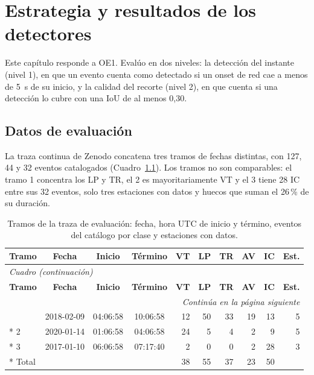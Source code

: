\documentclass[12pt,oneside,spanish,oldfontcommands]{memoir}
\begin{document}
\chapter[Estrategia y resultados de los detectores][Resultados de los detectores]{Estrategia y resultados de los detectores}
\label{cap:detectores}

Este capítulo responde a OE1. Evalúo en dos niveles: la detección del
instante (nivel 1), en que un evento cuenta como detectado si un onset de red
cae a menos de 5~s de su inicio, y la calidad del recorte (nivel 2), en que
cuenta si una detección lo cubre con una IoU de al menos 0,30.

\section{Datos de evaluación}
\label{sec:datos-evaluacion}

La traza continua de Zenodo \parencite{espinosacurilem2025dataset}
concatena tres tramos de fechas distintas, con 127, 44 y 32 eventos
catalogados (Cuadro~\ref{tab:tramos}). Los tramos no son comparables: el
tramo 1 concentra los LP y TR, el 2 es mayoritariamente VT y el 3 tiene 28 IC
entre sus 32 eventos, solo tres estaciones con datos y huecos que suman el
26\,\% de su duración.

{\small
\setlength{\tabcolsep}{4pt}
\begin{longtable}{lcccrrrrrr}
\caption{Tramos de la traza de evaluación: fecha, hora UTC de inicio y término, eventos del catálogo por clase y estaciones con datos.}\label{tab:tramos}\\
\toprule
\textbf{Tramo} & \textbf{Fecha} & \textbf{Inicio} & \textbf{Término} & \textbf{VT} & \textbf{LP} & \textbf{TR} & \textbf{AV} & \textbf{IC} & \textbf{Est.} \\
\midrule
\endfirsthead
\multicolumn{10}{l}{\itshape Cuadro \thetable{} (continuación)}\\
\toprule
\textbf{Tramo} & \textbf{Fecha} & \textbf{Inicio} & \textbf{Término} & \textbf{VT} & \textbf{LP} & \textbf{TR} & \textbf{AV} & \textbf{IC} & \textbf{Est.} \\
\midrule
\endhead
\midrule
\multicolumn{10}{r}{\itshape Continúa en la página siguiente}\\
\endfoot
\bottomrule
\endlastfoot
1 & 2018-02-09 & 04:06:58 & 10:06:58 & 12 & 50 & 33 & 19 & 13 & 5 \\*
2 & 2020-01-14 & 01:06:58 & 04:06:58 & 24 & 5 & 4 & 2 & 9 & 5 \\*
3 & 2017-01-10 & 06:06:58 & 07:17:40 & 2 & 0 & 0 & 2 & 28 & 3 \\*
\midrule\nopagebreak
Total & & & & 38 & 55 & 37 & 23 & 50 & \\
\end{longtable}
}
\end{document}

